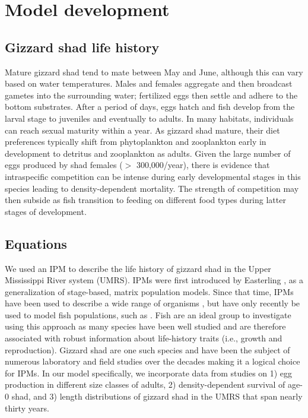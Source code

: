 \documentclass[preprint,review,12pt,authoryear]{elsarticle}
\begin{document}
\section{Model development}
\subsection{Gizzard shad life history}
Mature gizzard shad tend to mate between May and June, although this can vary based on water temperatures. 
Males and females aggregate and then broadcast gametes into the surrounding water; fertilized eggs then settle and adhere to the bottom substrates. 
After a period of days, eggs hatch and fish develop from the larval stage to juveniles and eventually to adults. 
In many habitats, individuals can reach sexual maturity within a year. 
As gizzard shad mature, their diet preferences typically shift from phytoplankton and zooplankton early in development to detritus and zooplankton as adults. 
Given the large number of eggs produced by shad females ($>$ 300,000/year), there is evidence that intraspecific competition can be intense during early developmental stages in this species leading to density-dependent mortality. 
The strength of competition may then subside as fish transition to feeding on different food types during latter stages of development.   

\subsection{Equations}
We used an IPM to describe the life history of gizzard shad in the Upper Mississippi River system (UMRS). 
IPMs were first introduced by Easterling \citep{easterling2000size}, as a generalization of stage-based, matrix population models. 
Since that time, IPMs have been used to describe a wide range of organisms \citep{ellner2016data, merow2014advancing, rees2014building}, but have only recently be used to model fish populations, such as \citep{erickson2017integral, liao2019dynamic, white2016fitting, pollesch2022developing}. 
Fish are an ideal group to investigate using this approach as many species have been well studied and are therefore associated with robust information about life-history traits (i.e., growth and reproduction). 
Gizzard shad are one such species and have been the subject of numerous laboratory and field studies over the decades making it a logical choice for IPMs.
In our model specifically, we incorporate data from studies on 1) egg production in different size classes of adults, 2) density-dependent survival of age-0 shad, and 3) length distributions of gizzard shad in the UMRS that span nearly thirty years.
\end{document}
